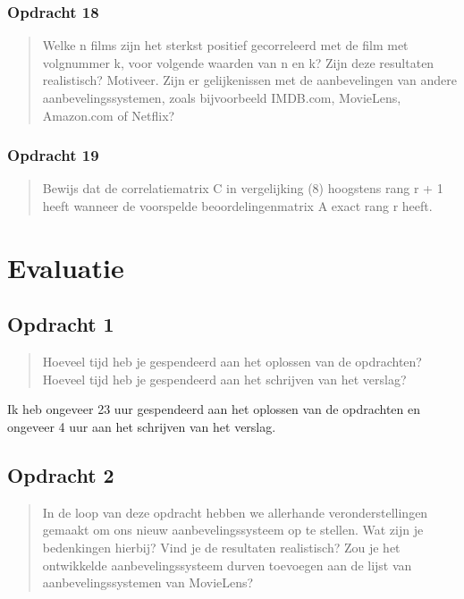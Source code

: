 \documentclass[11pt, a4paper, titlepage, openright]{article}
\begin{document}
	\subsubsection{Opdracht 18}
    \begin{quote}
        Welke n films zijn het sterkst positief gecorreleerd met de film met volgnummer k, voor volgende waarden van n en k?
        Zijn deze resultaten realistisch? Motiveer. Zijn er gelijkenissen met de aanbevelingen van andere aanbevelingssystemen,
        zoals bijvoorbeeld IMDB.com, MovieLens, Amazon.com of Netflix?
    \end{quote}

	\subsubsection{Opdracht 19}
    \begin{quote}
        Bewijs dat de correlatiematrix C in vergelijking (8) hoogstens rang r + 1 heeft wanneer de voorspelde beoordelingenmatrix
        A exact rang r heeft.
    \end{quote}


\section{Evaluatie}

	\subsection{Opdracht 1}
		\begin{quote}
			Hoeveel tijd heb je gespendeerd aan het oplossen van de opdrachten?
			Hoeveel tijd heb je gespendeerd aan het schrijven van het verslag?
		\end{quote}
        Ik heb ongeveer 23 uur gespendeerd aan het oplossen van de opdrachten en ongeveer 4 uur aan het schrijven van het verslag.

	\subsection{Opdracht 2}
		\begin{quote}
			In de loop van deze opdracht hebben we allerhande veronderstellingen gemaakt om ons nieuw aanbevelingssysteem
             op te stellen. Wat zijn je bedenkingen hierbij? Vind je de resultaten realistisch? Zou je het ontwikkelde
             aanbevelingssysteem durven toevoegen aan de lijst van aanbevelingssystemen van MovieLens?
		\end{quote}
\end{document}
